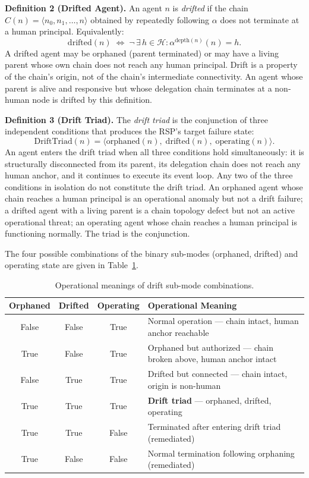 \medskip
\noindent\textbf{Definition 2 (Drifted Agent).}
An agent $n$ is \emph{drifted} if the chain $C(n) = \langle n_0, n_1, \ldots, n \rangle$ obtained by repeatedly following $\alpha$ does not terminate at a human principal. Equivalently:
\begin{equation}
\mathrm{drifted}(n) \;\iff\; \neg\,\exists\, h \in \mathcal{H} : \alpha^{\mathrm{depth}(n)}(n) = h.
\label{eq:rs-drifted-def}
\end{equation}
A drifted agent may be orphaned (parent terminated) or may have a living parent whose own chain does not reach any human principal. Drift is a property of the chain's origin, not of the chain's intermediate connectivity. An agent whose parent is alive and responsive but whose delegation chain terminates at a non-human node is drifted by this definition.

\medskip
\noindent\textbf{Definition 3 (Drift Triad).}
The \emph{drift triad} is the conjunction of three independent conditions that produces the RSP's target failure state:
\begin{equation}
\mathrm{DriftTriad}(n) = \langle \mathrm{orphaned}(n),\; \mathrm{drifted}(n),\; \mathrm{operating}(n) \rangle.
\label{eq:rs-drift-triad}
\end{equation}
An agent enters the drift triad when all three conditions hold simultaneously: it is structurally disconnected from its parent, its delegation chain does not reach any human anchor, and it continues to execute its event loop. Any two of the three conditions in isolation do not constitute the drift triad. An orphaned agent whose chain reaches a human principal is an operational anomaly but not a drift failure; a drifted agent with a living parent is a chain topology defect but not an active operational threat; an operating agent whose chain reaches a human principal is functioning normally. The triad is the conjunction.

The four possible combinations of the binary sub-modes (orphaned, drifted) and operating state are given in Table~\ref{tab:rs-drift-submodes}.

\begin{table}[h]
\centering
\begin{tabular}{c|c|c|p{5.2cm}}
\textbf{Orphaned} & \textbf{Drifted} & \textbf{Operating} & \textbf{Operational Meaning} \\ \hline
False & False & True  & Normal operation — chain intact, human anchor reachable \\
True  & False & True  & Orphaned but authorized — chain broken above, human anchor intact \\
False & True  & True  & Drifted but connected — chain intact, origin is non-human \\
True  & True  & True  & \textbf{Drift triad} — orphaned, drifted, operating \\
True  & True  & False & Terminated after entering drift triad (remediated) \\
True  & False & False & Normal termination following orphaning (remediated)
\end{tabular}
\caption{Operational meanings of drift sub-mode combinations.}
\label{tab:rs-drift-submodes}
\end{table}

